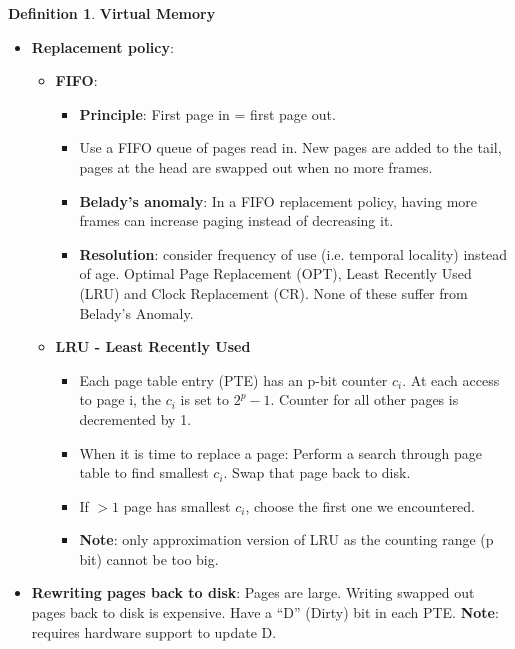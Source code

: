 \documentclass[11pt,a4paper]{article}
\theoremstyle{definition}
\newtheorem{definition}{Definition}[section]
\newenvironment{myitemize}
{ \begin{itemize}
    \setlength{\itemsep}{5pt}
    \setlength{\parskip}{0pt}
    \setlength{\parsep}{0pt}     }
{ \end{itemize}                  }
\begin{document}
\begin{definition}{\textbf{Virtual Memory}}
\begin{myitemize}
\begin{myitemize}
		\item \textbf{Demand Paging}: Page is loaded when an access is made to a location inside it.
		\item \textbf{Pre-paging}: Other pages (e.g. surrounding pages) can be loaded together with the fault page. Pages can be pre-loaded when a process starts.
		\item Can be a mix of strategies.
	\end{myitemize}
	\item \textbf{Replacement policy}:
	\begin{myitemize}
		\item \textbf{FIFO}: 
		\begin{myitemize}
 			\item \textbf{Principle}: First page in = first page out.
		\item Use a FIFO queue of pages read in. New pages are added to the tail, pages at the head are swapped out when no more frames.
		\item \textbf{Belady's anomaly}: In a FIFO replacement policy, having more frames can increase paging instead of decreasing it.
		\item \textbf{Resolution}: consider frequency of use (i.e. temporal locality) instead of age. Optimal Page Replacement (OPT), Least Recently Used (LRU) and Clock Replacement (CR). None of these suffer from Belady's Anomaly.
		\end{myitemize}
		\item \textbf{LRU - Least Recently Used}
		\begin{myitemize}
			\item Each page table entry (PTE) has an p-bit counter $c_i$. At each access to page i, the $c_i$ is set to $2^p-1$. Counter for all other pages is decremented by 1.
			\item When it is time to replace a page: Perform a search through page table to find smallest $c_i$. Swap that page back to disk.
			\item If $>1$ page has smallest $c_i$, choose the first one we encountered.
			\item \textbf{Note}: only approximation version of LRU as the counting range (p bit) cannot be too big.
		\end{myitemize}
		\end{myitemize}
		\item \textbf{Rewriting pages back to disk}: Pages are large. Writing swapped out pages back to disk is expensive. Have a ``D'' (Dirty) bit in each PTE. \textbf{Note}: requires hardware support to update D.
\end{myitemize}
\end{definition}
\end{document}
